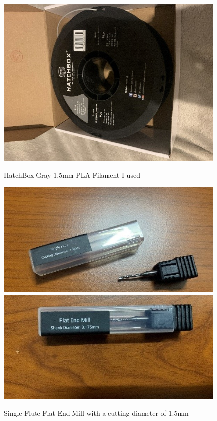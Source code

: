 \documentclass[twoside]{article}
\begin{document}
\begin{figure}[H]
	\centering
	
	\begin{minipage}{0.4\linewidth}
		\centering
		\includegraphics[width=\textwidth, angle=-90]{pla}
		\caption{HatchBox Gray 1.5mm PLA Filament I used}
	\end{minipage}
	\hfill	
	\begin{minipage}{0.4\linewidth}
		\centering
		\includegraphics[width=\textwidth]{mill_bit}
		\includegraphics[width=\textwidth]{mill_bit_closed}
		\caption{Single Flute Flat End Mill with a cutting diameter of 1.5mm}
	\end{minipage}
\end{figure}
\end{document}
